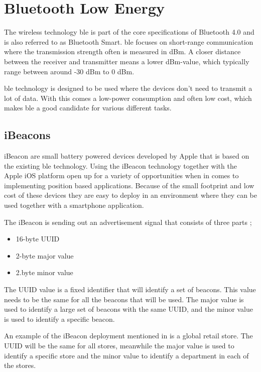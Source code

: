 \section{Bluetooth Low Energy}\label{sec:theoryBle}
The wireless technology \acrfull{ble} is part of the core specifications of Bluetooth 4.0 and is also referred to as Bluetooth Smart.
\acrshort{ble} focuses on short-range communication where the transmission strength often is measured in dBm.
A closer distance between the receiver and transmitter means a lower dBm-value, which typically range between around -30 dBm to 0 dBm.
\cite{DevelopmentMobileIndoor2017} 

\bigskip

\acrshort{ble} technology is designed to be used where the devices don't need to transmit a lot of data.
With this comes a low-power consumption and often low cost, which makes \acrshort{ble} a good candidate for various different tasks.
\cite{PracticalFingerprintingLocalization2017} 


\subsection{iBeacons}\label{sec:theoryBleiBeacons}
iBeacon are small battery powered devices developed by Apple that is based on the existing \acrshort{ble} technology.
Using the iBeacon technology together with the Apple iOS platform open up for a variety of opportunities when in comes to implementing position based applications.
Because of the small footprint and low cost of these devices they are easy to deploy in an environment where they can be used together with a smartphone application.
\cite{BluetoothLowEnergy2018} 

\bigskip

The iBeacon is sending out an advertisement signal that consists of three parts \cite{GettingStartedIBeacon2014};
\begin{itemize}
\item 16-byte UUID
\item 2-byte major value
\item 2.byte minor value
\end{itemize}

The UUID value is a fixed identifier that will identify a set of beacons.
This value needs to be the same for all the beacons that will be used.
The major value is used to identify a large set of beacons with the same UUID, and the minor value is used to identify a specific beacon.
\cite{GettingStartedIBeacon2014}

\bigskip

An example of the iBeacon deployment mentioned in \cite{GettingStartedIBeacon2014} is a global retail store. The UUID will be the same for all stores, meanwhile the major value is used to identify a specific store and the minor value to identify a department in each of the stores.
\cite{GettingStartedIBeacon2014} 

